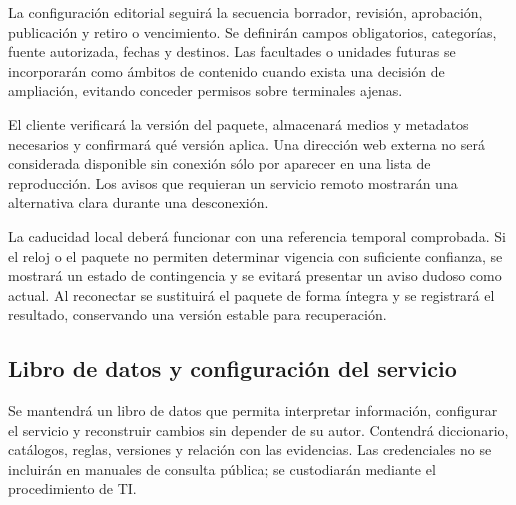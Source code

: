 La configuración editorial seguirá la secuencia borrador, revisión, aprobación, publicación y retiro o vencimiento. Se definirán campos obligatorios, categorías, fuente autorizada, fechas y destinos. Las facultades o unidades futuras se incorporarán como ámbitos de contenido cuando exista una decisión de ampliación, evitando conceder permisos sobre terminales ajenas.

El cliente verificará la versión del paquete, almacenará medios y metadatos necesarios y confirmará qué versión aplica. Una dirección web externa no será considerada disponible sin conexión sólo por aparecer en una lista de reproducción. Los avisos que requieran un servicio remoto mostrarán una alternativa clara durante una desconexión.

La caducidad local deberá funcionar con una referencia temporal comprobada. Si el reloj o el paquete no permiten determinar vigencia con suficiente confianza, se mostrará un estado de contingencia y se evitará presentar un aviso dudoso como actual. Al reconectar se sustituirá el paquete de forma íntegra y se registrará el resultado, conservando una versión estable para recuperación.

\subsection{Libro de datos y configuración del servicio}
Se mantendrá un libro de datos que permita interpretar información, configurar el servicio y reconstruir cambios sin depender de su autor. Contendrá diccionario, catálogos, reglas, versiones y relación con las evidencias. Las credenciales no se incluirán en manuales de consulta pública; se custodiarán mediante el procedimiento de TI.


